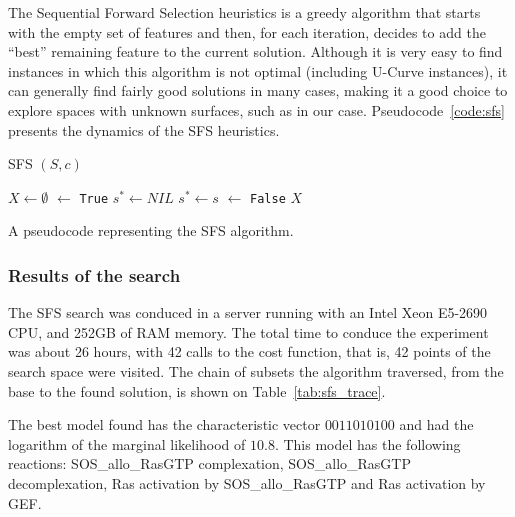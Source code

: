 The Sequential Forward Selection heuristics is a greedy algorithm that
starts with the empty set of features and then, for each iteration,
decides to add the ``best'' remaining feature to the current solution.
Although it is very easy to find instances in which this algorithm is
not optimal (including U-Curve instances), it can generally find  fairly
good solutions in many cases, making it a good choice to explore spaces
with unknown surfaces, such as in our case. Pseudocode~\ref{code:sfs}
presents the dynamics of the SFS heuristics.

\begin{algorithm}[H]
\textsc{SFS} $(S, c)$
\begin{algorithmic}[1]
    \State $X \gets \emptyset$
     $\gets$ {\tt True}
        \State $s^* \gets NIL$
                \State $s^* \gets s$
            \EndIf
        \EndFor
             $\gets$ {\tt False}
        \EndIf
    \EndWhile
    \Return $X$
\end{algorithmic}
\caption{A pseudocode representing the SFS algorithm.}
\label{code:sfs}
\end{algorithm}


\subsubsection{Results of the search}
The SFS search was conduced in a server running with an Intel 
Xeon E5-2690 CPU, and 252GB of RAM memory. The total time to conduce the
experiment was about 26 hours, with 42 calls to the cost function, that
is, 42 points of the search space were visited. The chain of subsets the
algorithm traversed, from the base to the found solution, is shown on 
Table~\ref{tab:sfs_trace}.

The best model found has the characteristic vector $0011010100$ and had 
the logarithm of the marginal likelihood of $10.8$. This model has the 
following reactions: SOS\_allo\_RasGTP complexation, SOS\_allo\_RasGTP
decomplexation, Ras activation by SOS\_allo\_RasGTP and Ras activation
by GEF.


